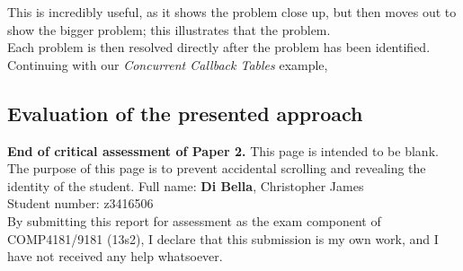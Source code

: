\documentclass[9pt]{report}
\begin{document}
This is incredibly useful, as it shows the problem close up, but then moves out to show the bigger problem; this illustrates that the problem.\\

Each problem is then resolved directly after the problem has been identified.
Continuing with our {\it Concurrent Callback Tables} example, 

\subsection*{Evaluation of the presented approach}

\noindent
{\bf End of critical assessment of Paper 2.}
\clearpage
\noindent
This page is intended to be blank.\\

\noindent
The purpose of this page is to prevent accidental scrolling and revealing the identity of the student.
\clearpage
\noindent
Full name: \hspace{8mm} {\bf Di Bella}, Christopher James\\
Student number: z3416506\\

\noindent
By submitting this report for assessment as the exam component of COMP4181/9181 (13s2), I declare that this submission is my own work, and I have not received any help whatsoever.
\end{document}
